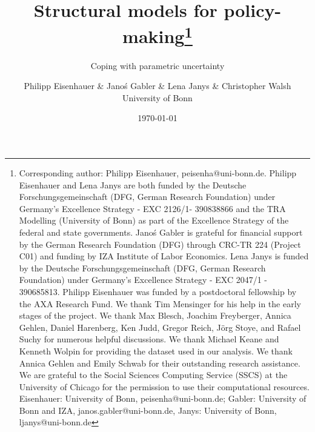 \title{Structural models for policy-making\thanks{Corresponding author: Philipp Eisenhauer, peisenha@uni-bonn.de. Philipp Eisenhauer and Lena Janys are both funded by the Deutsche Forschungsgemeinschaft (DFG, German Research Foundation) under Germany's Excellence Strategy - EXC 2126/1- 390838866 and the TRA Modelling (University of Bonn) as part of the Excellence Strategy of the federal and state governments. Jano\'s Gabler is grateful for financial support by the German Research Foundation (DFG) through CRC-TR 224 (Project C01) and funding by IZA Institute of Labor Economics. Lena Janys is funded by the Deutsche Forschungsgemeinschaft (DFG, German Research Foundation) under Germany's Excellence Strategy - EXC 2047/1 - 390685813. Philipp Eisenhauer was funded by a postdoctoral fellowship by the AXA Research Fund. We thank Tim Mensinger for his help in the early stages of the project. We thank Max Blesch, Joachim Freyberger, Annica Gehlen, Daniel Harenberg, Ken Judd, Gregor Reich, J\"org Stoye, and Rafael Suchy for numerous helpful discussions. We thank Michael Keane and Kenneth Wolpin for providing the dataset used in our analysis. We thank Annica Gehlen and Emily Schwab for their outstanding research assistance. We are grateful to the Social Sciences Computing Service (SSCS) at the University of Chicago for the permission to use their computational resources. Eisenhauer: University of Bonn, peisenha@uni-bonn.de; Gabler: University of Bonn and IZA, janos.gabler@uni-bonn.de, Janys: University of Bonn, ljanys@uni-bonn.de}}
\subtitle{Coping with parametric uncertainty}
\author{Philipp Eisenhauer \& Jano\'s Gabler \& Lena Janys \& Christopher Walsh\\ University of Bonn\vspace{0.5cm}}
\date{\today}
